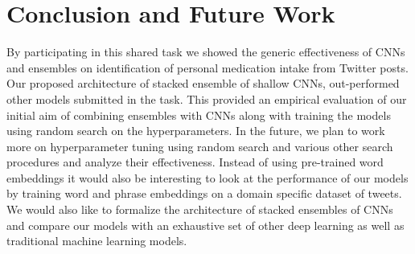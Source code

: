 \documentclass[conference]{IEEEtran}
\begin{document}
\section{Conclusion and Future Work}
By participating in this shared task we showed the generic effectiveness of CNNs and ensembles on identification of personal medication intake from Twitter posts. Our proposed architecture of stacked ensemble of shallow CNNs, out-performed other models submitted in the task. This provided an empirical evaluation of our initial aim of combining ensembles with CNNs along with training the models using random search on the hyperparameters. In the future, we plan to work more on hyperparameter tuning using random search and various other search procedures and analyze their effectiveness. Instead of using pre-trained word embeddings it would also be interesting to look at the performance of our models by training word and phrase embeddings on a domain specific dataset of tweets. We would also like to formalize the architecture of stacked ensembles of CNNs and compare our models with an exhaustive set of other deep learning as well as traditional machine learning models.





\end{document}
